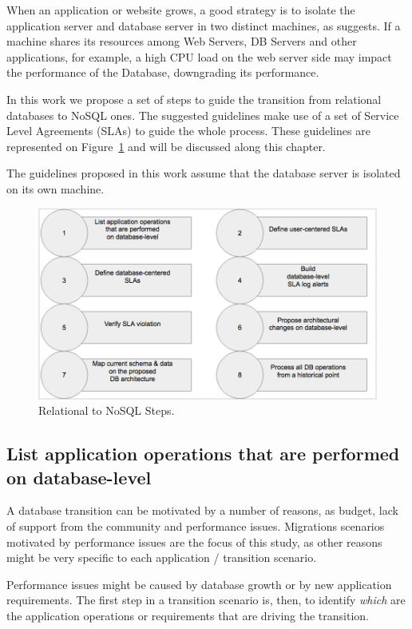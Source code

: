 When an application or website grows, a good strategy is to isolate the application server and database server in two distinct machines, as \cite{dorm} suggests. If a machine shares its resources among Web Servers, DB Servers and other applications, for example, a high CPU load on the web server side may impact the performance of the Database, downgrading its performance. 

In this work we propose a set of steps to guide the transition from relational databases to NoSQL ones. The suggested guidelines make use of a set of Service Level Agreements (SLAs) to guide the whole process. These guidelines are represented on Figure~\ref{fig:guidelinesNoSQL} and will be discussed along this chapter.

The guidelines proposed in this work assume that the database server is isolated on its own machine.

\begin{figure}[ht!]
\centering
\includegraphics[width=150mm]{Imagens/guidelines.png}
\caption{Relational to NoSQL Steps.\label{fig:guidelinesNoSQL}}
\end{figure}

\subsection{List application operations that are performed on database-level}

A database transition can be motivated by a number of reasons, as budget, lack of support from the community and performance issues. Migrations scenarios motivated by performance issues are the focus of this study, as other reasons might be very specific to each application / transition scenario. 

Performance issues might be caused by database growth or by new application requirements. The first step in a transition scenario is, then, to identify \textit{which} are the application operations or requirements that are driving the transition. 

